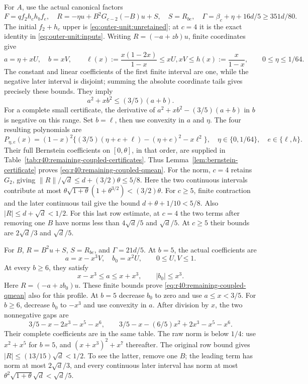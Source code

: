 For \(A\), use the actual canonical factors
\[
 F=qf_2h_ch_bf_e,\quad
 R=-\eta u+B^2G_{c-2}(-B)u+S,\quad S=R_{be},\quad
 \Gamma=\beta_c+\eta+16d/5\ge351d/80 .
\]
The initial \(f_2+h_c\) upper is \eqref{eq:outer-unit:unretained};
at \(c=4\) it is the exact identity in \eqref{eq:outer-unit:inputs}.
Writing \(R=(-a+zb)u\), finite coordinates give
\[
 a=\eta+xU,\quad b=xV,\qquad
 \ell(x):=\frac{x(1-2x)}{1-x}\le xU,xV\le
 h(x):=\frac{x}{1-x},\qquad0\le\eta\le1/64 .
\]
The constant and linear coefficients of the first finite interval are
one, while the negative later interval is disjoint; summing the
absolute coordinate tails gives precisely these bounds.
They imply
\begin{equation}\label{eq:r40:remaining-coupled-qmean}
 a^2+xb^2\le(3/5)(a+b).
\end{equation}
For a complete small certificate, the derivative of
\(a^2+xb^2-(3/5)(a+b)\) in \(b\) is negative on this range.
Set \(b=\ell\), then use convexity in \(a\) and \(\eta\).
The four resulting polynomials are
\[
 P_{\eta,e}(x)=(1-x)^2
 \{(3/5)(\eta+e+\ell)-(\eta+e)^2-x\ell^2\},
 \quad \eta\in\{0,1/64\},\quad e\in\{\ell,h\}.
\]
Their full Bernstein coefficients on \([0,\theta]\), in that order,
are supplied in Table~\ref{tab:r40:remaining-coupled-certificates}.
Thus Lemma~\ref{lem:bernstein-certificate} proves
\eqref{eq:r40:remaining-coupled-qmean}.
For the norm, \(c=4\) retains \(G_2\), giving
\(\|R\|/\sqrt d\le d+(3/2)\theta\le5/8\).
Here the two continuous intervals contribute at most
\(\theta\sqrt{1+\theta}(1+\theta^{3/2})<(3/2)\theta\).
For \(c\ge5\), finite contraction and the later continuous tail give
the bound \(d+\theta+1/10<5/8\).
Also \(|R|\le d+\sqrt d<1/2\).
For this last row estimate, at \(c=4\) the two terms after removing
one \(B\) have norms less than \(4\sqrt d/5\) and \(\sqrt d/5\).
At \(c\ge5\) their bounds are \(2\sqrt d/3\) and \(\sqrt d/5\).

For \(B\), \(R=B^2u+S\), \(S=R_{be}\), and
\(\Gamma=21d/5\). At \(b=5\), the actual coefficients are
\[
 a=x-x^3V,\quad b_0=x^2U,\qquad0\le U,V\le1.
\]
At every \(b\ge6\), they satisfy
\[
 x-x^3\le a\le x+x^3,\qquad |b_0|\le x^3 .
\]
Here \(R=(-a+zb_0)u\). These finite bounds prove
\eqref{eq:r40:remaining-coupled-qmean} also for this profile.
At \(b=5\) decrease \(b_0\) to zero and use \(a\le x<3/5\).
For \(b\ge6\), decrease \(b_0\) to \(-x^3\) and use convexity in \(a\).
After division by \(x\), the two nonnegative gaps are
\[
 3/5-x-2x^3-x^5-x^6,\qquad
 3/5-x-(6/5)x^2+2x^3-x^5-x^6.
\]
Their complete coefficients are in the same table.
The raw norm is below \(1/4\): use \(x^2+x^5\) for \(b=5\), and
\((x+x^3)^2+x^7\) thereafter. The original row bound gives
\(|R|\le(13/15)\sqrt d<1/2\).
To see the latter, remove one \(B\); the leading term has norm
at most \(2\sqrt d/3\), and every continuous later interval has
norm at most \(\theta^2\sqrt{1+\theta}\sqrt d<\sqrt d/5\).

